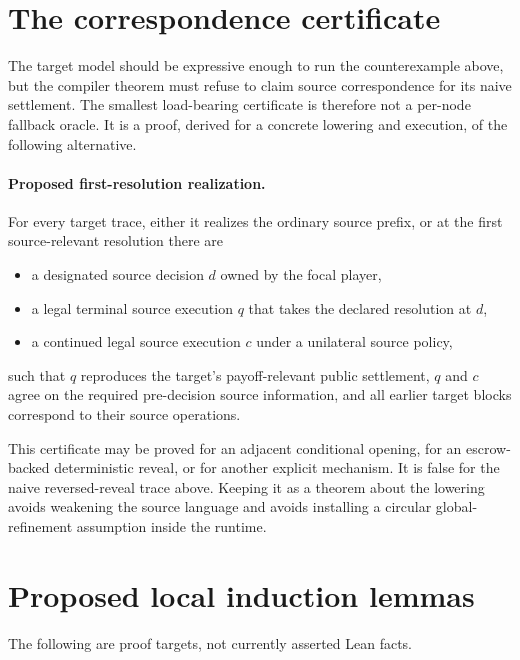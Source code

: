 \documentclass[11pt]{article}
\begin{document}
\section{The correspondence certificate}

The target model should be expressive enough to run the counterexample above,
but the compiler theorem must refuse to claim source correspondence for its
naive settlement.  The smallest load-bearing certificate is therefore not a
per-node fallback oracle.  It is a proof, derived for a concrete lowering and
execution, of the following alternative.

\paragraph{Proposed first-resolution realization.}
For every target trace, either it realizes the ordinary source prefix, or at
the first source-relevant resolution there are
\begin{itemize}
\item a designated source decision $d$ owned by the focal player,
\item a legal terminal source execution $q$ that takes the declared resolution
      at $d$,
\item a continued legal source execution $c$ under a unilateral source policy,
\end{itemize}
such that $q$ reproduces the target's payoff-relevant public settlement, $q$
and $c$ agree on the required pre-decision source information, and all earlier
target blocks correspond to their source operations.

This certificate may be proved for an adjacent conditional opening, for an
escrow-backed deterministic reveal, or for another explicit mechanism.  It is
false for the naive reversed-reveal trace above.  Keeping it as a theorem about
the lowering avoids weakening the source language and avoids installing a
circular global-refinement assumption inside the runtime.

\section{Proposed local induction lemmas}

The following are proof targets, not currently asserted Lean facts.
\end{document}
